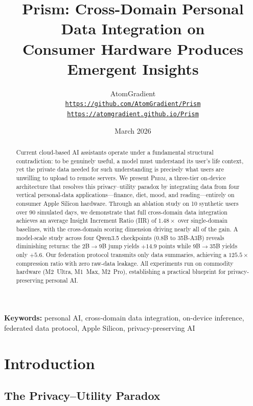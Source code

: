 \documentclass[11pt,a4paper]{article}
\title{%
  \textbf{Prism: Cross-Domain Personal Data Integration on \\
  Consumer Hardware Produces Emergent Insights}%
}
\author{%
  AtomGradient\\
  \texttt{\url{https://github.com/AtomGradient/Prism}}\\
  \texttt{\url{https://atomgradient.github.io/Prism}}
}
\date{March 2026}
\newcommand{\echostream}{\textsc{Prism}}
\newcommand{\iir}{\textsc{IIR}}
\begin{document}
\maketitle

\begin{abstract}
Current cloud-based AI assistants operate under a fundamental structural
contradiction: to be genuinely useful, a model must understand its user's life
context, yet the private data needed for such understanding is precisely what
users are unwilling to upload to remote servers. We present \echostream{}, a
three-tier on-device architecture that resolves this privacy--utility paradox by
integrating data from four vertical personal-data applications---finance, diet,
mood, and reading---entirely on consumer Apple Silicon hardware. Through an
ablation study on 10 synthetic users over 90 simulated days, we demonstrate
that full cross-domain data integration achieves an average Insight Increment
Ratio (\iir{}) of $1.48\times$ over single-domain baselines, with the
cross-domain scoring dimension driving nearly all of the gain. A model-scale
study across four Qwen3.5 checkpoints (0.8B to 35B-A3B) reveals diminishing
returns: the 2B$\to$9B jump yields $+14.9$ points while 9B$\to$35B yields only
$+5.6$. Our federation protocol transmits only data summaries, achieving a
$125.5\times$ compression ratio with zero raw-data leakage. All experiments run
on commodity hardware (M2~Ultra, M1~Max, M2~Pro), establishing a practical
blueprint for privacy-preserving personal AI.
\end{abstract}

\vspace{0.5em}
\noindent\textbf{Keywords:} personal AI, cross-domain data integration,
on-device inference, federated data protocol, Apple Silicon, privacy-preserving AI

\section{Introduction}
\label{sec:intro}

\subsection{The Privacy--Utility Paradox}
\end{document}
